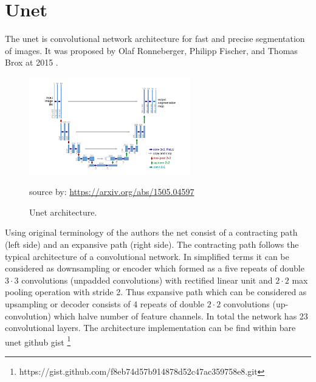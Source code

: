 \section{Unet}
The unet is convolutional network architecture for fast and precise segmentation of images. It was proposed by Olaf Ronneberger, Philipp Fischer, and Thomas Brox at 2015 \cite{Ronneberger2015}. 
\begin{figure}[h]
    \centering \includegraphics[width=7cm]{images/unet.png}
    \caption {Unet architecture.}
    \small source by: \url{https://arxiv.org/abs/1505.04597}
\end{figure}

Using original terminology of the authors \cite{Ronneberger2015} the net consist of a contracting path (left side) and an expansive path (right side). The contracting path follows the typical architecture of a convolutional network. In simplified terms it can be considered as downsampling or encoder which formed as
a five repeats of double $3 \cdot 3$ convolutions (unpadded convolutions) with rectified linear unit and $2 \cdot 2$ max pooling operation with stride 2. Thus expansive path which can be considered as upsampling or decoder consists of 4 repeats of double $2 \cdot 2$ convolutions (up-convolution) which halve number of feature channels. In total the network has 23 convolutional layers. The architecture implementation can be find within bare unet github gist \footnote{https://gist.github.com/f8eb74d57b914878d52c47ac359758e8.git}

